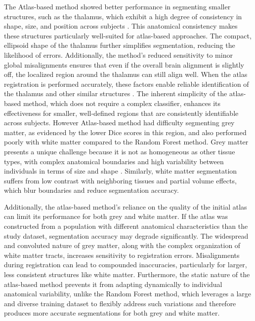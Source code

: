 The Atlas-based method showed better performance in segmenting smaller structures, such as the thalamus, which exhibit a high degree of consistency in shape, size, and position across subjects \cite{b16}. This anatomical consistency makes these structures particularly well-suited for atlas-based approaches. The compact, ellipsoid shape of the thalamus further simplifies segmentation, reducing the likelihood of errors. Additionally, the method’s reduced sensitivity to minor global misalignments ensures that even if the overall brain alignment is slightly off, the localized region around the thalamus can still align well. When the atlas registration is performed accurately, these factors enable reliable identification of the thalamus and other similar structures \cite{b17}. The inherent simplicity of the atlas-based method, which does not require a complex classifier, enhances its effectiveness for smaller, well-defined regions that are consistently identifiable across subjects. However Atlas-based method had difficulty segmenting grey matter, as evidenced by the lower Dice scores in this region, and also performed poorly with white matter compared to the Random Forest method. Grey matter presents a unique challenge because it is not as homogeneous as other tissue types, with complex anatomical boundaries and high variability between individuals in terms of size and shape \cite{b18}. Similarly, white matter segmentation suffers from low contrast with neighboring tissues and partial volume effects, which blur boundaries and reduce segmentation accuracy.

Additionally, the atlas-based method's reliance on the quality of the initial atlas can limit its performance for both grey and white matter. If the atlas was constructed from a population with different anatomical characteristics than the study dataset, segmentation accuracy may degrade significantly. The widespread and convoluted nature of grey matter, along with the complex organization of white matter tracts, increases sensitivity to registration errors. Misalignments during registration can lead to compounded inaccuracies, particularly for larger, less consistent structures like white matter. Furthermore, the static nature of the atlas-based method prevents it from adapting dynamically to individual anatomical variability, unlike the Random Forest method, which leverages a large and diverse training dataset to flexibly address such variations and therefore produces more accurate segmentations for both grey and white matter.

